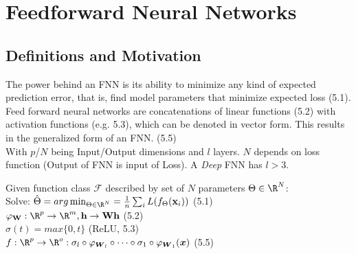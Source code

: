 \documentclass[english]{latex4ei/latex4ei_sheet}
\begin{document}
\section{Feedforward Neural Networks}
\begin{sectionbox}
\subsection{Definitions and Motivation}
The power behind an FNN is its ability to minimize any kind of expected prediction error, that is, find model parameters that minimize expected loss (5.1). Feed forward neural networks are concatenations of linear functions (5.2) with activation functions (e.g. 5.3), which can be denoted in vector form. This results in the generalized form of an FNN. (5.5)\\
With $p$/$N$ being Input/Output dimensions and $l$ layers. $N$ depends on loss function (Output of FNN is input of Loss). A \emph{Deep} FNN has $l>3$.
\begin{emphbox}
    Given function class $\mathcal{F}$ described by set of $N$ parameters $\Theta\in\R^N$:\\
    Solve: $\hat{\Theta}=arg\min_{\Theta\in\R^N}=\frac{1}{n}\sum_iL(f_\Theta(\mathbf{x}_i))$ (5.1)\\
    $\varphi_\mathbf{W}:\R^p\to \R^m, \mathbf{h}\to \mathbf{Wh}$ (5.2)\\
    $\sigma(t)=max\{0,t\}$ (ReLU, 5.3)\\
    $f:\R^p \rightarrow \R^o: \sigma_l\circ\varphi_{\boldsymbol{W}_l}\circ\cdots\circ\sigma_1\circ\varphi_{\boldsymbol{W}_1}(\boldsymbol{x})$ (5.5)
\end{emphbox}

\end{sectionbox}
\end{document}
